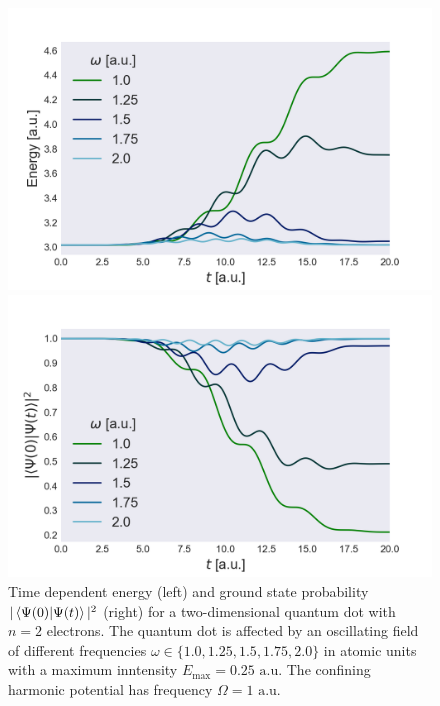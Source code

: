 \begin{figure}
    \centering
    \begin{minipage}{0.49\textwidth}
        \includegraphics[trim=2em 0em 5em 0em, width=\textwidth]{results/figures/2D/resonance/n2resonance.png} 
    \end{minipage}\hfill
    \begin{minipage}{0.49\textwidth}
        \includegraphics[trim=0em 0em 5em 0em, width=\textwidth]{results/figures/2D/resonance/n2overlap_res.png} 
    \end{minipage}
    \caption{Time dependent energy (left) and ground state probability $|\braket{\Psi(0)}{\Psi(t)}|^2$
        (right) for a two-dimensional quantum dot with $n=2$ electrons. The quantum dot 
        is affected by an oscillating field of different frequencies
        $\omega\in\{1.0, 1.25, 1.5, 1.75, 2.0\}$ in atomic units with a maximum inntensity
        $E_\text{max} = 0.25 \text{ a.u.}$ The confining harmonic potential has frequency
        $\Omega=1 \text{ a.u.}$
    }
    \label{fig:2d_resonance_n2}
\end{figure}

